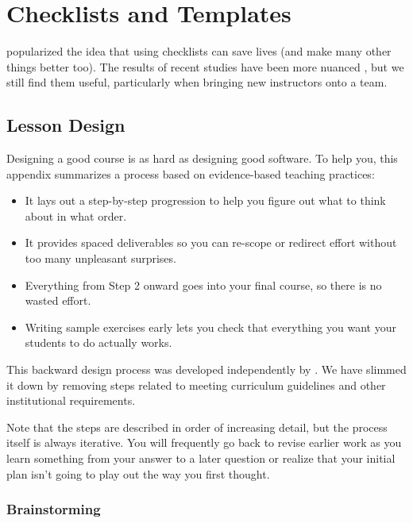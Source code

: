 \chapter{Checklists and Templates}\label{s:checklist}

\cite{Gawa2007} popularized the idea that using checklists can save
lives (and make many other things better too). The results of recent
studies have been more nuanced \cite{Avel2013,Urba2014}, but we still
find them useful, particularly when bringing new instructors onto a
team.

\section{Lesson Design}\label{s:checklists-design}

Designing a good course is as hard as designing good software. To help
you, this appendix summarizes a process based on evidence-based teaching
practices:

\begin{itemize}
\item
  It lays out a step-by-step progression to help you figure out what
  to think about in what order.
\item
  It provides spaced deliverables so you can re-scope or redirect
  effort without too many unpleasant surprises.
\item
  Everything from Step 2 onward goes into your final course, so there
  is no wasted effort.
\item
  Writing sample exercises early lets you check that everything you
  want your students to do actually works.
\end{itemize}

This backward design process was developed independently by
\cite{Wigg2005,Bigg2011,Fink2013}. We have
slimmed it down by removing steps related to meeting curriculum
guidelines and other institutional requirements.

Note that the steps are described in order of increasing detail, but the
process itself is always iterative. You will frequently go back to
revise earlier work as you learn something from your answer to a later
question or realize that your initial plan isn't going to play out the
way you first thought.

\subsection{Brainstorming}

